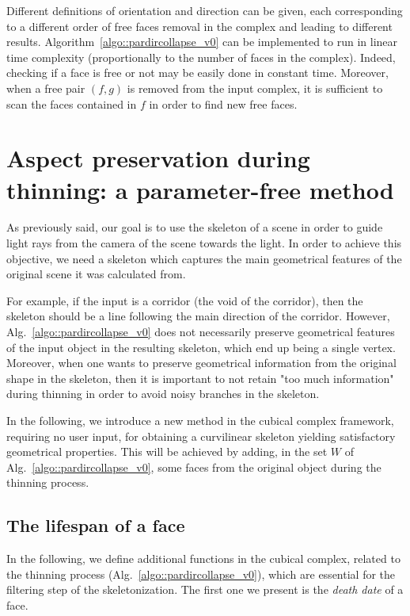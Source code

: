 \documentclass[final,envcountsame]{llncs}
\def\myem#1{{\em #1}}
\begin{document}
Different definitions of orientation and direction can be given, each corresponding to a different order of free faces removal in the complex and leading to different results.
Algorithm~\ref{algo::pardircollapse_v0} can be implemented to run in linear time complexity (proportionally to the number of faces in the complex). Indeed, checking if a face is free or not may be easily done in constant time. Moreover, when a free pair $(f,g)$ is removed from the input complex, it is sufficient to scan the faces contained in $f$ in order to find new free faces.



\section{Aspect preservation during thinning: a parameter-free method}
\label{sec::aspect_no_param}
As previously said, our goal is to use the skeleton of a scene in order to guide light rays from the camera of the scene towards the light. In order to achieve this objective, we need a skeleton which captures the main geometrical features of the original scene it was calculated from. 

For example, if the input is a corridor (the void of the corridor), then the skeleton should be a line following the main direction of the corridor. 
However, Alg.~\ref{algo::pardircollapse_v0} does not necessarily preserve geometrical features of the input object in the resulting skeleton, which end up being a single vertex.
Moreover, when one wants to preserve geometrical information from the original shape in the skeleton, then it is important to not retain "too much information" during thinning in order to avoid noisy branches in the skeleton.

In the following, we introduce a new method in the cubical complex framework, requiring no user input, for obtaining a curvilinear skeleton yielding satisfactory geometrical properties. This will be achieved by adding, in the set $W$ of Alg.~\ref{algo::pardircollapse_v0}, some faces from the original object during the thinning process.

\subsection{The lifespan of a face}
In the following, we define additional functions in the cubical complex, related to the thinning process (Alg.~\ref{algo::pardircollapse_v0}), which are essential for the filtering step of the skeletonization. The first one we present is the \myem{death date} of a face.
\end{document}

